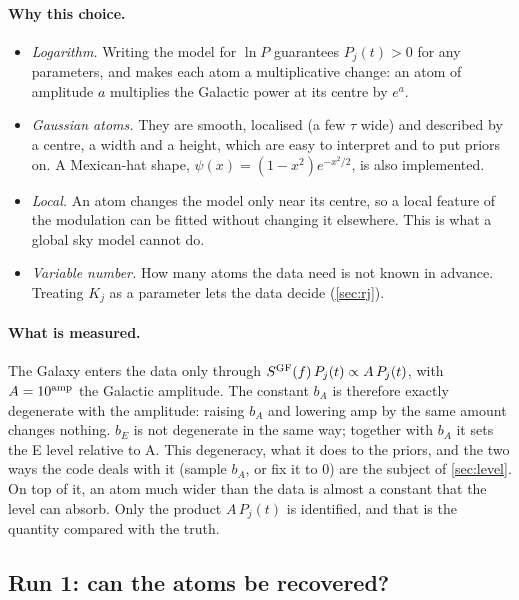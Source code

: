 \documentclass[11pt,a4paper]{article}
\begin{document}
\paragraph{Why this choice.}
\begin{itemize}
  \item \emph{Logarithm.} Writing the model for $\ln P$ guarantees $P_j(t)>0$ for any
        parameters, and makes each atom a multiplicative change: an atom of amplitude
        $a$ multiplies the Galactic power at its centre by $e^{a}$.
  \item \emph{Gaussian atoms.} They are smooth, localised (a few $\tau$ wide) and
        described by a centre, a width and a height, which are easy to interpret and to
        put priors on. A Mexican-hat shape, $\psi(x)=(1-x^2)e^{-x^2/2}$, is also
        implemented.
  \item \emph{Local.} An atom changes the model only near its centre, so a local
        feature of the modulation can be fitted without changing it elsewhere. This is
        what a global sky model cannot do.
  \item \emph{Variable number.} How many atoms the data need is not known in advance.
        Treating $K_j$ as a parameter lets the data decide (\cref{sec:rj}).
\end{itemize}

\paragraph{What is measured.} The Galaxy enters the data only through
$S^{\rm GF}(f)\,P_j(t)\propto A\,P_j(t)$, with $A=10^{\rm amp}$ the Galactic
amplitude. The constant $b_A$ is therefore exactly degenerate with the amplitude:
raising $b_A$ and lowering amp by the same amount changes nothing. $b_E$ is not
degenerate in the same way; together with $b_A$ it sets the E level relative to A.
This degeneracy, what it does to the priors, and the two ways the code deals with it
(sample $b_A$, or fix it to 0) are the subject of \cref{sec:level}. On top of it, an
atom much wider than the data is almost a constant that the level can absorb. Only the
product $A\,P_j(t)$ is identified, and that is the quantity compared with the truth.

\subsection{Run 1: can the atoms be recovered?}
\end{document}
